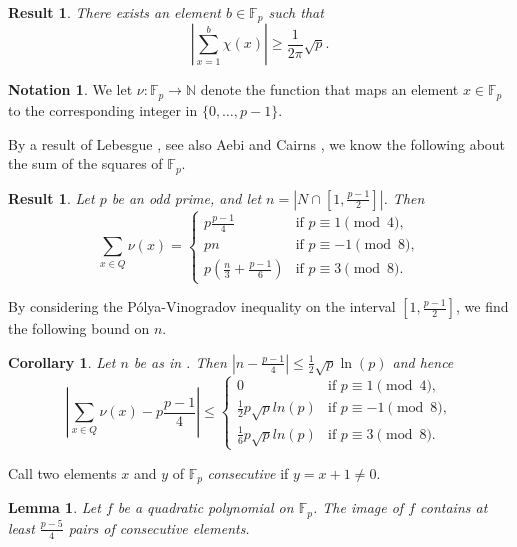 \documentclass[a4paper, 12pt]{article}
\newtheorem{lm}[thm]{Lemma}
\newtheorem{res}[thm]{Result}
\newtheorem{crl}[thm]{Corollary}
\theoremstyle{definition}
\newtheorem{nota}[thm]{Notation}
\newcommand{\FF}{\mathbb F}
\newcommand{\NN}{\mathbb N}
\begin{document}
\begin{res}
 \label{Res:Csikvari}
 There exists an element $b \in \FF_p$ such that
 \[
  \left| \sum_{x=1}^b \chi(x) \right| \geq \frac1{2\pi} \sqrt p.
 \]
\end{res}

\begin{nota}
 We let $\nu:\FF_p \to \NN$ denote the function that maps an element $x \in \FF_p$ to the corresponding integer in $\{0,\dots,p-1\}$.
\end{nota}

By a result of Lebesgue \cite{Lebesgue:42}, see also Aebi and Cairns \cite{Aebi:Cairns}, we know the following about the sum of the squares of $\FF_p$.

\begin{res}
 \label{Res:Lebesgue}
 Let $p$ be an odd prime, and let $n = \left| N \cap \left[ 1, \frac{p-1}2 \right] \right|$.
 Then
 \[
  \sum_{x \in Q} \nu(x) = \begin{cases}
   p\frac{p-1}{4} & \text{if } p \equiv 1 \pmod 4, \\
   pn & \text{if } p \equiv -1 \pmod 8, \\
   p \left( \frac n3 + \frac{p-1}6 \right) & \text{if } p \equiv 3 \pmod 8.
  \end{cases}
 \]
\end{res}

By considering the P\'olya-Vinogradov inequality on the interval $\left[1,\frac{p-1}2\right]$, we find the following bound on $n$.

\begin{crl}
 \label{Crl:Lebesgue}
 Let $n$ be as in .
 Then $\left| n - \frac{p-1}4 \right| \leq \frac 1 2 \sqrt p \ln(p)$ and hence
 \[
  \left|\sum_{x \in Q} \nu(x) - p\frac{p-1}4 \right| \leq \begin{cases}
   0 & \text{if } p \equiv 1 \pmod 4, \\
   \frac{1}2 p\sqrt{p}ln(p) & \text{if } p \equiv -1 \pmod 8, \\
   \frac{1}6 p\sqrt{p}ln(p) & \text{if } p \equiv 3 \pmod 8.
  \end{cases}
 \]
\end{crl}

Call two elements $x$ and $y$ of $\FF_p$ \emph{consecutive} if $y = x+1 \neq 0$.

\begin{lm}
 \label{Lm:Consecutive}
 Let $f$ be a quadratic polynomial on $\FF_p$.
 The image of $f$ contains at least $\frac{p-5}{4}$ pairs of consecutive elements.
\end{lm}
\end{document}
